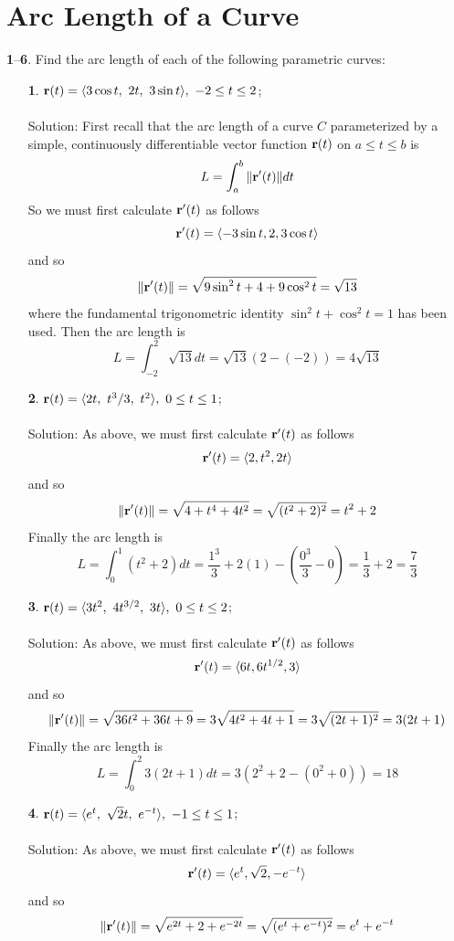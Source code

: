 \documentclass[12pt]{amsbook}
\newcommand{\la}{\langle}
\newcommand{\ra}{\rangle}
\begin{document}
\newpage
\section{Arc Length of a Curve}

\noindent
{\small {\bf 1}--{\bf 6}}. Find the arc length of each of the following parametric curves:
\begin{enumerate}
  \item[{\small\bf 1}.] ${\bf r}(t)=\la 3\cos t,\ 2t,\ 3\sin t\ra, \ -2 \leq t \leq 2$;
  \\
  \\
  {\sc Solution}: First recall that the arc length of a curve $C$ parameterized by a simple, continuously differentiable vector function ${\bf r}(t)$ on $a \leq t \leq b$ is 
  $$L=\int_a^b \|{\bf r}'(t)\|dt$$
  So we must first calculate ${\bf r}'(t)$ as follows
  $${\bf r}'(t)=\la -3\sin t, 2, 3\cos t \ra$$
  and so 
  $$\|{\bf r}'(t)\|=\sqrt{9\sin^2 t +4+9\cos^2 t}=\sqrt{13}$$
  where the fundamental trigonometric identity $\sin^2 t+\cos^2 t=1$ has been used. Then the arc length is
  $$L=\int_{-2}^2 \sqrt{13}dt=\sqrt{13}(2-(-2))=4\sqrt{13}$$
  \item[{\small\bf 2}.] ${\bf r}(t)=\la 2t,\ t^3/3,\ t^2 \ra, \ 0 \leq t \leq 1 $;
  \\
  \\
  {\sc Solution}: As above, we must first calculate ${\bf r}'(t)$ as follows
  $${\bf r}'(t)=\la 2,t^2,2t \ra$$
  and so 
  $$\|{\bf r}'(t)\|=\sqrt{4 +t^4+4t^2}=
  \sqrt{(t^2+2)^2}=t^2+2$$
   Finally the arc length is
  $$L=\int_{0}^1 (t^2+2)dt=\frac{1^3}{3}+2(1)-(\frac{0^3}{3}-0)=\frac{1}{3}+2=\frac{7}{3}$$
  \item[{\small\bf 3}.] ${\bf r}(t)=\la 3t^2 ,\ 4t^{3/2},\ 3t \ra, \ 0 \leq t \leq 2$;
  \\
  \\
  {\sc Solution}: As above, we must first calculate ${\bf r}'(t)$ as follows
  $${\bf r}'(t)=\la 6t, 6t^{1/2}, 3 \ra$$
  and so 
  $$\|{\bf r}'(t)\|=\sqrt{36t^2 +36t+9}=3\sqrt{4t^2+4t+1}=3\sqrt{(2t+1)^2}=3(2t+1)$$
   Finally the arc length is
  $$L=\int_{0}^2 3(2t+1)dt=3(2^2+2-(0^2+0))=18$$
  \item[{\small\bf 4}.] ${\bf r}(t)=\la e^{t},\ \sqrt{2}t,\ e^{-t}\ra, \ -1 \leq t \leq 1$;
  \\
  \\
  {\sc Solution}: As above, we must first calculate ${\bf r}'(t)$ as follows
  $${\bf r}'(t)=\la e^t,\sqrt{2},-e^{-t} \ra$$
  and so 
  $$\|{\bf r}'(t)\|=\sqrt{e^{2t}+2+e^{-2t}}=\sqrt{(e^t+e^{-t})^2}=e^t+e^{-t}$$

\end{enumerate}
\end{document}
